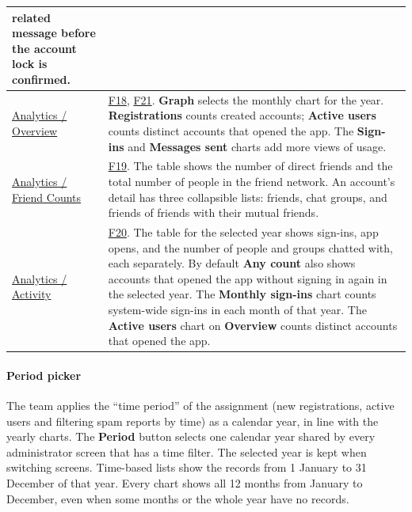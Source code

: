 \begin{longtable}{|L{4.3cm}|L{\dimexpr\textwidth-4.3cm-4\arrayrulewidth\relax}|}
  related message before the account lock is confirmed.\\
  \hline
  \href{https://www.figma.com/design/maCogjZs9eOOhfkxsOZoIU?node-id=53-934}{Analytics / Overview}
  & \hyperlink{F18}{F18}, \hyperlink{F21}{F21}. \textbf{Graph} selects the monthly
  chart for the year. \textbf{Registrations} counts created accounts;
  \textbf{Active users} counts distinct accounts that opened the app. The
  \textbf{Sign-ins} and \textbf{Messages sent} charts add more views of usage.\\
  \hline
  \href{https://www.figma.com/design/maCogjZs9eOOhfkxsOZoIU?node-id=53-1087}{Analytics / Friend Counts}
  & \hyperlink{F19}{F19}. The table shows the number of direct friends and the total
  number of people in the friend network. An account's detail has three collapsible
  lists: friends, chat groups, and friends of friends with their mutual friends.\\
  \hline
  \href{https://www.figma.com/design/maCogjZs9eOOhfkxsOZoIU?node-id=53-1279}{Analytics / Activity}
  & \hyperlink{F20}{F20}. The table for the selected year shows sign-ins, app opens,
  and the number of people and groups chatted with, each separately. By default
  \textbf{Any count} also shows accounts that opened the app without signing in
  again in the selected year. The \textbf{Monthly sign-ins} chart counts system-wide
  sign-ins in each month of that year. The \textbf{Active users} chart on
  \textbf{Overview} counts distinct accounts that opened the app.\\
  \hline
\end{longtable}
\endgroup

\paragraph{Period picker}
\mbox{}\par
The team applies the ``time period'' of the assignment (new registrations, active
users and filtering spam reports by time) as a calendar year, in line with the
yearly charts.
The \textbf{Period} button selects one calendar year shared by every administrator
screen that has a time filter. The selected year is kept when switching screens.
Time-based lists show the records from 1 January to 31 December of that year.
Every chart shows all 12 months from January to December, even when some months or
the whole year have no records.

